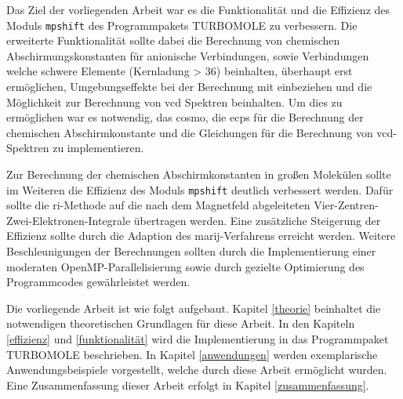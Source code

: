 Das Ziel der vorliegenden Arbeit war es die Funktionalität und die Effizienz des Moduls \texttt{mpshift} des Programmpakets \textsc{TURBOMOLE}\supercite{TURBOMOLE,grimme2010consistent,born1927quantentheorie} zu verbessern. Die erweiterte Funktionalität sollte dabei die Berechnung von chemischen Abschirmungskonstanten für anionische Verbindungen, sowie Verbindungen welche schwere Elemente (Kernladung > 36) beinhalten, überhaupt erst ermöglichen, Umgebungseffekte bei der Berechnung mit einbeziehen und die Möglichkeit zur Berechnung von \ac{vcd} Spektren beinhalten. Um dies zu ermöglichen war es notwendig, das \ac{cosmo}, die \acp{ecp} für die Berechnung der chemischen Abschirmkonstante und die Gleichungen für die Berechnung von \ac{vcd}-Spektren zu implementieren. 

Zur Berechnung der chemischen Abschirmkonstanten in großen Molekülen sollte im Weiteren die Effizienz des Moduls \texttt{mpshift} deutlich verbessert werden. Dafür sollte die \ac{ri}-Methode auf die nach dem Magnetfeld abgeleiteten Vier-Zentren-Zwei-Elektronen-Integrale übertragen werden. Eine zusätzliche Steigerung der Effizienz sollte durch die Adaption des \ac{marij}-Verfahrens erreicht werden. Weitere Beschleunigungen der Berechnungen sollten durch die Implementierung einer moderaten OpenMP-Parallelisierung sowie durch gezielte Optimierung des Programmcodes gewährleistet werden. 

\bigskip
Die vorliegende Arbeit ist wie folgt aufgebaut. Kapitel \ref{theorie} beinhaltet die notwendigen theoretischen Grundlagen für diese Arbeit. In den Kapiteln \ref{effizienz} und \ref{funktionalität} wird die Implementierung in das Programmpaket \textsc{TURBOMOLE} beschrieben. In Kapitel \ref{anwendungen} werden exemplarische Anwendungsbeispiele vorgestellt, welche durch diese Arbeit ermöglicht wurden. Eine Zusammenfassung dieser Arbeit erfolgt in Kapitel \ref{zusammenfassung}.